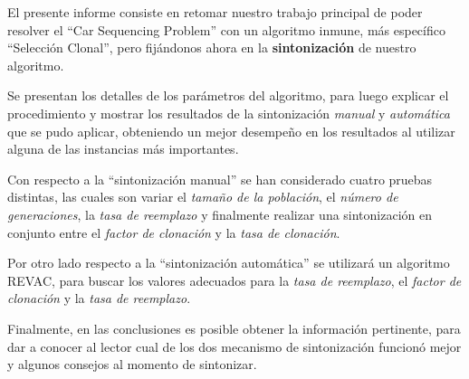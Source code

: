 El presente informe consiste en retomar nuestro trabajo principal
de poder resolver el ``Car Sequencing Problem'' con un algoritmo
inmune, más específico ``Selección Clonal'', pero fijándonos ahora
en la \textbf{sintonización} de nuestro algoritmo.

Se presentan los detalles de los parámetros del algoritmo,
para luego explicar el procedimiento y mostrar los resultados
de la sintonización \emph{manual} y \emph{automática} que se pudo
aplicar, obteniendo un mejor desempeño en los resultados al utilizar
alguna de las instancias más importantes.

Con respecto a la ``sintonización manual'' se han considerado cuatro
pruebas distintas, las cuales son variar el \emph{tamaño de la población},
el \emph{número de generaciones}, la \emph{tasa de reemplazo} y finalmente
realizar una sintonización en conjunto entre el \emph{factor de clonación}
y la \emph{tasa de clonación}.

Por otro lado respecto a la ``sintonización automática'' se utilizará
un algoritmo REVAC, para buscar los valores adecuados para la \emph{tasa
 de  reemplazo}, el \emph{factor de clonación} y la \emph{tasa de reemplazo}. 

Finalmente, en las conclusiones es posible obtener la información
pertinente, para dar a conocer al lector cual de los dos mecanismo
de sintonización funcionó mejor y algunos consejos al momento
de sintonizar.

